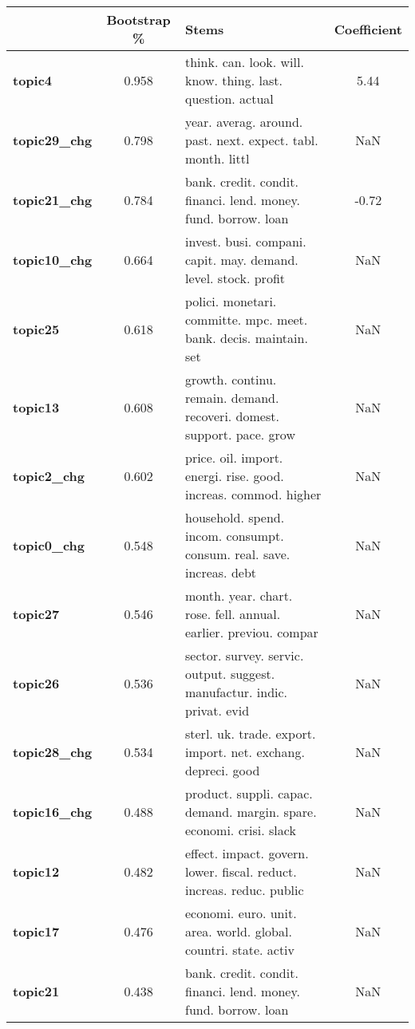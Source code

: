 \begin{tabular}{|l|c|l|c|}
\toprule
{} & Bootstrap \% &                                                                     Stems &  Coefficient \\
\midrule
\textbf{topic4     } &  0.958 &  think. can. look. will. know. thing. last. question. actual &  5.44 \\
\textbf{topic29\_chg} &  0.798 &  year. averag. around. past. next. expect. tabl. month. littl & NaN \\
\textbf{topic21\_chg} &  0.784 &  bank. credit. condit. financi. lend. money. fund. borrow. loan & -0.72 \\
\textbf{topic10\_chg} &  0.664 &  invest. busi. compani. capit. may. demand. level. stock. profit & NaN \\
\textbf{topic25    } &  0.618 &  polici. monetari. committe. mpc. meet. bank. decis. maintain. set & NaN \\
\textbf{topic13    } &  0.608 &  growth. continu. remain. demand. recoveri. domest. support. pace. grow & NaN \\
\textbf{topic2\_chg } &  0.602 &  price. oil. import. energi. rise. good. increas. commod. higher & NaN \\
\textbf{topic0\_chg } &  0.548 &  household. spend. incom. consumpt. consum. real. save. increas. debt & NaN \\
\textbf{topic27    } &  0.546 &  month. year. chart. rose. fell. annual. earlier. previou. compar & NaN \\
\textbf{topic26    } &  0.536 &  sector. survey. servic. output. suggest. manufactur. indic. privat. evid & NaN \\
\textbf{topic28\_chg} &  0.534 &  sterl. uk. trade. export. import. net. exchang. depreci. good & NaN \\
\textbf{topic16\_chg} &  0.488 &  product. suppli. capac. demand. margin. spare. economi. crisi. slack & NaN \\
\textbf{topic12    } &  0.482 &  effect. impact. govern. lower. fiscal. reduct. increas. reduc. public & NaN \\
\textbf{topic17    } &  0.476 &  economi. euro. unit. area. world. global. countri. state. activ & NaN \\
\textbf{topic21    } &  0.438 &  bank. credit. condit. financi. lend. money. fund. borrow. loan & NaN \\
\bottomrule
\end{tabular}
